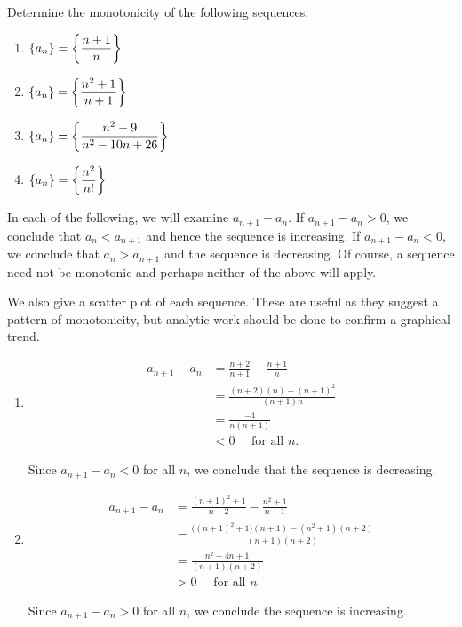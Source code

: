 \begin{example} \label{eg:7.1.6} %
Determine the monotonicity of the following sequences.

\begin{enumerate}[1)]
\item $\displaystyle \{a_n\} = \left\{\frac{n+1}n\right\}$
\item	$\displaystyle \{a_n\} = \left\{\frac{n^2+1}{n+1}\right\}$	
\item $\displaystyle \{a_n\} = \left\{\frac{n^2-9}{n^2-10n+26}\right\}$
\item	$\displaystyle \{a_n\} = \left\{\frac{n^2}{n!}\right\}$	
\end{enumerate}

\solution In each of the following, we will examine $a_{n+1}-a_n$. If $a_{n+1}-a_n >0$, we conclude that $a_n<a_{n+1}$ and hence the sequence is increasing. If $a_{n+1}-a_n<0$, we conclude that $a_n>a_{n+1}$ and the sequence is decreasing. Of course, a sequence need not be monotonic and perhaps neither of the above will apply.

We also give a scatter plot of each sequence. These are useful as they suggest a pattern of monotonicity, but analytic work should be done to confirm a graphical trend.

\begin{enumerate}[1)]
\item	
\begin{align*}
a_{n+1}-a_n &= \frac{n+2}{n+1} - \frac{n+1}{n} \\		
&= \frac{(n+2)(n)-(n+1)^2}{(n+1)n} \\
&=	\frac{-1}{n(n+1)} \\
&<0 \quad\text{ for all $n$.}
\end{align*}
				
Since $a_{n+1}-a_n<0$ for all $n$, we conclude that the sequence is decreasing.

\item	
\begin{align*}	
a_{n+1}-a_n &= \frac{(n+1)^2+1}{n+2} - \frac{n^2+1}{n+1} \\		
&= \frac{\big((n+1)^2+1\big)(n+1)- (n^2+1)(n+2)}{(n+1)(n+2)}\\
&=	\frac{n^2+4n+1}{(n+1)(n+2)} \\
&> 0 \quad \text{ for all $n$.}
\end{align*}
					
Since $a_{n+1}-a_n>0$ for all $n$, we conclude the sequence is increasing.


\end{enumerate}
\end{example}

